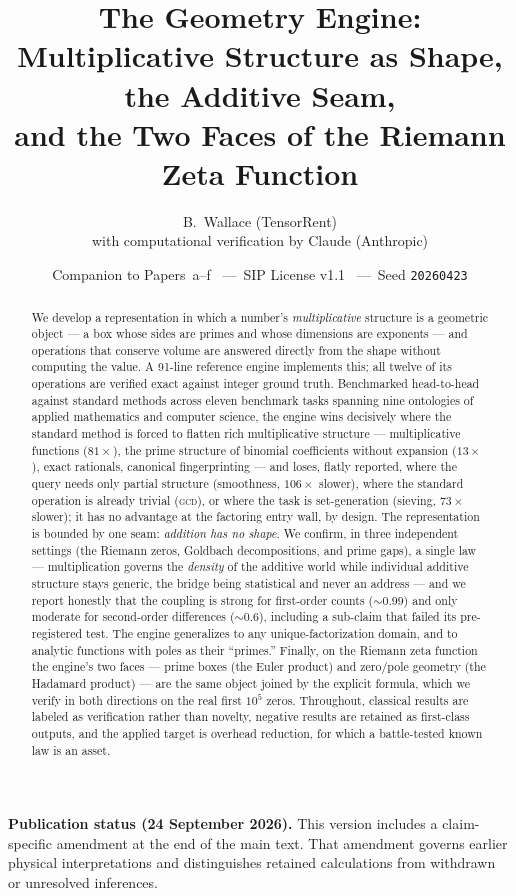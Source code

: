 \documentclass[11pt]{article}
\title{\textbf{The Geometry Engine:\\
Multiplicative Structure as Shape, the Additive Seam,\\
and the Two Faces of the Riemann Zeta Function}}
\author{B.\ Wallace \quad (TensorRent)\\
\small with computational verification by Claude (Anthropic)}
\date{\small Companion to Papers~a--f \ ---\ SIP License v1.1 \ ---\ Seed \texttt{20260423}}
\begin{document}
\maketitle

\begin{abstract}
We develop a representation in which a number's \emph{multiplicative} structure is a geometric object --- a
box whose sides are primes and whose dimensions are exponents --- and operations that conserve volume are
answered directly from the shape without computing the value. A 91-line reference engine implements this;
all twelve of its operations are verified exact against integer ground truth. Benchmarked head-to-head
against standard methods across eleven benchmark tasks spanning nine ontologies of applied mathematics and computer science, the engine wins
decisively where the standard method is forced to flatten rich multiplicative structure --- multiplicative
functions ($81\times$), the prime structure of binomial coefficients without expansion ($13\times$),
exact rationals, canonical fingerprinting --- and loses, flatly reported, where the query needs only partial
structure (smoothness, $106\times$ slower), where the standard operation is already trivial (\textsc{gcd}),
or where the task is set-generation (sieving, $73\times$ slower); it has no advantage at the factoring entry
wall, by design. The representation is bounded by one seam: \emph{addition has no shape}. We confirm, in three
independent settings (the Riemann zeros, Goldbach decompositions, and prime gaps), a single law --- multiplication
governs the \emph{density} of the additive world while individual additive structure stays generic, the bridge
being statistical and never an address --- and we report honestly that the coupling is strong for first-order
counts ($\sim\!0.99$) and only moderate for second-order differences ($\sim\!0.6$), including a sub-claim that
failed its pre-registered test. The engine generalizes to any unique-factorization domain, and to analytic
functions with poles as their ``primes.'' Finally, on the Riemann zeta function the engine's two faces --- prime
boxes (the Euler product) and zero/pole geometry (the Hadamard product) --- are the same object joined by the
explicit formula, which we verify in both directions on the real first $10^5$ zeros. Throughout, classical
results are labeled as verification rather than novelty, negative results are retained as first-class outputs,
and the applied target is overhead reduction, for which a battle-tested known law is an asset.
\end{abstract}
\par\smallskip\noindent\textbf{Publication status (24 September 2026).}
This version includes a claim-specific amendment at the end of the main text.
That amendment governs earlier physical interpretations and distinguishes
retained calculations from withdrawn or unresolved inferences.\par\smallskip
\end{document}
